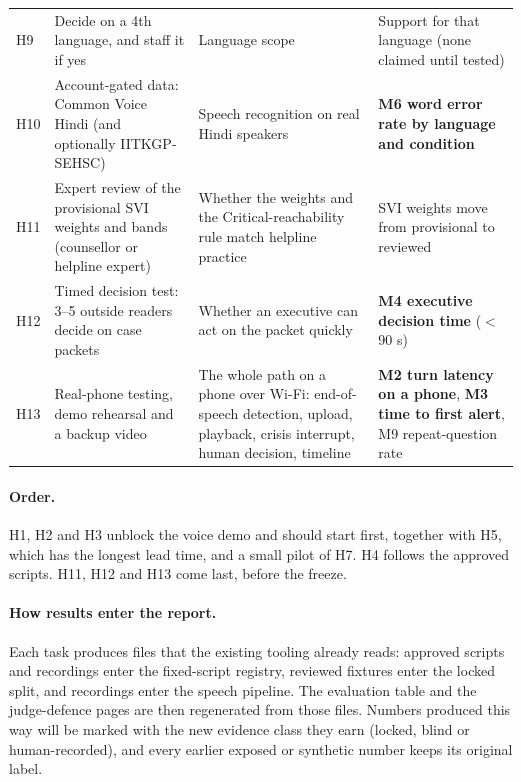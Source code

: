 \begin{longtable}{@{}>{\raggedright\arraybackslash}p{0.8cm}>{\raggedright\arraybackslash}p{4.2cm}>{\raggedright\arraybackslash}p{4.6cm}>{\raggedright\arraybackslash}p{4.4cm}@{}}
H9 & Decide on a 4th language, and staff it if yes & Language scope & Support for that language (none claimed until tested) \\
H10 & Account-gated data: Common Voice Hindi (and optionally IITKGP-SEHSC) & Speech recognition on real Hindi speakers & \textbf{M6 word error rate by language and condition} \\
H11 & Expert review of the provisional SVI weights and bands (counsellor or helpline expert) & Whether the weights and the Critical-reachability rule match helpline practice & SVI weights move from provisional to reviewed \\
H12 & Timed decision test: 3--5 outside readers decide on case packets & Whether an executive can act on the packet quickly & \textbf{M4 executive decision time} ($<$ 90 s) \\
H13 & Real-phone testing, demo rehearsal and a backup video & The whole path on a phone over Wi-Fi: end-of-speech detection, upload, playback, crisis interrupt, human decision, timeline & \textbf{M2 turn latency on a phone}, \textbf{M3 time to first alert}, M9 repeat-question rate \\
\bottomrule
\end{longtable}

\paragraph{Order.} H1, H2 and H3 unblock the voice demo and should start first, together with H5,
which has the longest lead time, and a small pilot of H7. H4 follows the approved scripts. H11, H12
and H13 come last, before the freeze.

\paragraph{How results enter the report.} Each task produces files that the existing tooling already
reads: approved scripts and recordings enter the fixed-script registry, reviewed fixtures enter the
locked split, and recordings enter the speech pipeline. The evaluation table and the judge-defence
pages are then regenerated from those files. Numbers produced this way will be marked with the new
evidence class they earn (locked, blind or human-recorded), and every earlier exposed or synthetic
number keeps its original label.
